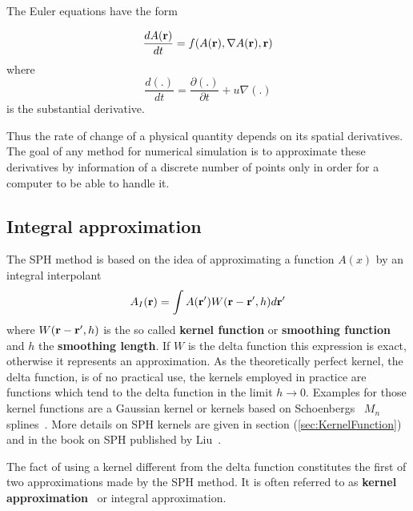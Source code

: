 \documentclass[11pt,a4paper,twoside]{report}
\begin{document}
The Euler equations have the form~\cite{Monaghan2005}

\begin {equation}
\label{eq:EFD_form}
{\frac{dA({\bf r})}{dt}}=f(A({\bf r}),\nabla A({\bf r}),{\bf r})
\end {equation}
where
\begin {equation}
{\frac{d(.)}{dt}}={\frac{\partial(.)}{ \partial t}}+u\nabla(.)
\end{equation}
is the substantial derivative.

Thus the rate of change of a physical quantity depends on its spatial
derivatives. The goal of any method for numerical simulation is to approximate
these derivatives by information of a discrete number of points only in order for a computer to be able to handle it. 

\subsection{Integral approximation}

The SPH method is based on the idea of approximating a function $A(x)$ by an
integral interpolant
\begin{equation}
\label{eq:int_interpolant}
A_I({\bf r})=\int A({\bf r'})W({\bf r}-{\bf r'},h)d{\bf r'}
\end{equation}
where $W({\bf r}-{\bf r'},h)$ is the so called {\bf kernel function} or {\bf smoothing function} and $h$ the
{\bf smoothing length}. If $W$ is the delta function this expression is exact,
otherwise it represents an approximation. As the theoretically
perfect kernel, the delta function, is of no practical use, the kernels
employed in practice are functions which tend to the delta function in the 
limit $h\rightarrow 0$.
Examples for those kernel functions are a Gaussian kernel or
kernels based on Schoenbergs~\cite{Schoenberg1946} $M_n$ splines~\cite{Monaghan2005}.
More details on SPH kernels are given in section
(\ref{sec:KernelFunction}) and in the book on SPH published by Liu~\cite{Liu2003}.

The fact of using a kernel different from the delta function constitutes the
first of two approximations made by the SPH method. It is often referred to as {\bf kernel approximation}~\cite{Liu2003} or integral approximation.
\end{document}
